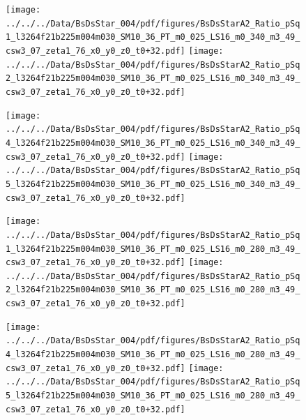 \documentclass[a4paper,10pt]{article}
\begin{document}
\begin{figure}[p]
 \texttt{[image: ../../../Data/BsDsStar\_004/pdf/figures/BsDsStarA2\_Ratio\_pSq1\_l3264f21b225m004m030\_SM10\_36\_PT\_m0\_025\_LS16\_m0\_340\_m3\_49\_csw3\_07\_zeta1\_76\_x0\_y0\_z0\_t0+32.pdf]} 
 \texttt{[image: ../../../Data/BsDsStar\_004/pdf/figures/BsDsStarA2\_Ratio\_pSq2\_l3264f21b225m004m030\_SM10\_36\_PT\_m0\_025\_LS16\_m0\_340\_m3\_49\_csw3\_07\_zeta1\_76\_x0\_y0\_z0\_t0+32.pdf]} 
 \end{figure}
\begin{figure}[p]
 \texttt{[image: ../../../Data/BsDsStar\_004/pdf/figures/BsDsStarA2\_Ratio\_pSq4\_l3264f21b225m004m030\_SM10\_36\_PT\_m0\_025\_LS16\_m0\_340\_m3\_49\_csw3\_07\_zeta1\_76\_x0\_y0\_z0\_t0+32.pdf]} 
 \texttt{[image: ../../../Data/BsDsStar\_004/pdf/figures/BsDsStarA2\_Ratio\_pSq5\_l3264f21b225m004m030\_SM10\_36\_PT\_m0\_025\_LS16\_m0\_340\_m3\_49\_csw3\_07\_zeta1\_76\_x0\_y0\_z0\_t0+32.pdf]} 
 \end{figure}
\begin{figure}[p]
 \texttt{[image: ../../../Data/BsDsStar\_004/pdf/figures/BsDsStarA2\_Ratio\_pSq1\_l3264f21b225m004m030\_SM10\_36\_PT\_m0\_025\_LS16\_m0\_280\_m3\_49\_csw3\_07\_zeta1\_76\_x0\_y0\_z0\_t0+32.pdf]} 
 \texttt{[image: ../../../Data/BsDsStar\_004/pdf/figures/BsDsStarA2\_Ratio\_pSq2\_l3264f21b225m004m030\_SM10\_36\_PT\_m0\_025\_LS16\_m0\_280\_m3\_49\_csw3\_07\_zeta1\_76\_x0\_y0\_z0\_t0+32.pdf]} 
 \end{figure}
\clearpage
\begin{figure}[p]
 \texttt{[image: ../../../Data/BsDsStar\_004/pdf/figures/BsDsStarA2\_Ratio\_pSq4\_l3264f21b225m004m030\_SM10\_36\_PT\_m0\_025\_LS16\_m0\_280\_m3\_49\_csw3\_07\_zeta1\_76\_x0\_y0\_z0\_t0+32.pdf]} 
 \texttt{[image: ../../../Data/BsDsStar\_004/pdf/figures/BsDsStarA2\_Ratio\_pSq5\_l3264f21b225m004m030\_SM10\_36\_PT\_m0\_025\_LS16\_m0\_280\_m3\_49\_csw3\_07\_zeta1\_76\_x0\_y0\_z0\_t0+32.pdf]} 
 \end{figure}
\clearpage
\end{document}
